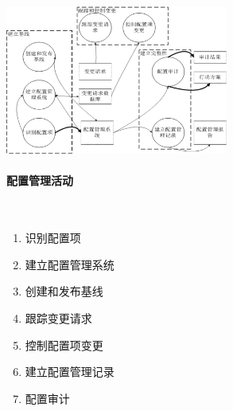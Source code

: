 \begin{table}
    \centering
    \vspace{-1.5em}
    \includegraphics[width=0.55\textwidth]{images/配置管理活动.png}
    \vspace{-5.5em}
\end{table}
\paragraph{配置管理活动}~{} \par
\begin{enumerate}[label=\arabic*.]
    \item 识别配置项
    \item 建立配置管理系统
    \item 创建和发布基线
    \item 跟踪变更请求
    \item 控制配置项变更
    \item 建立配置管理记录
    \item 配置审计
\end{enumerate}

